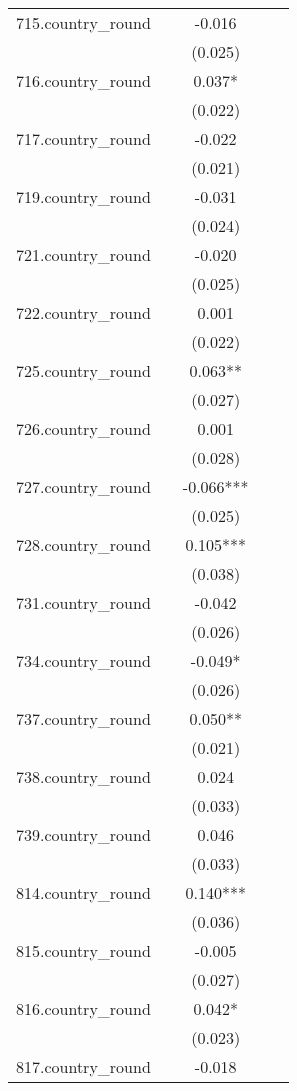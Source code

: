 \documentclass[]{article}
\begin{document}
\begin{tabular}{lcccc}
715.country\_round &  & -0.016 &  &  \\
 &  & (0.025) &  &  \\
716.country\_round &  & 0.037* &  &  \\
 &  & (0.022) &  &  \\
717.country\_round &  & -0.022 &  &  \\
 &  & (0.021) &  &  \\
719.country\_round &  & -0.031 &  &  \\
 &  & (0.024) &  &  \\
721.country\_round &  & -0.020 &  &  \\
 &  & (0.025) &  &  \\
722.country\_round &  & 0.001 &  &  \\
 &  & (0.022) &  &  \\
725.country\_round &  & 0.063** &  &  \\
 &  & (0.027) &  &  \\
726.country\_round &  & 0.001 &  &  \\
 &  & (0.028) &  &  \\
727.country\_round &  & -0.066*** &  &  \\
 &  & (0.025) &  &  \\
728.country\_round &  & 0.105*** &  &  \\
 &  & (0.038) &  &  \\
731.country\_round &  & -0.042 &  &  \\
 &  & (0.026) &  &  \\
734.country\_round &  & -0.049* &  &  \\
 &  & (0.026) &  &  \\
737.country\_round &  & 0.050** &  &  \\
 &  & (0.021) &  &  \\
738.country\_round &  & 0.024 &  &  \\
 &  & (0.033) &  &  \\
739.country\_round &  & 0.046 &  &  \\
 &  & (0.033) &  &  \\
814.country\_round &  & 0.140*** &  &  \\
 &  & (0.036) &  &  \\
815.country\_round &  & -0.005 &  &  \\
 &  & (0.027) &  &  \\
816.country\_round &  & 0.042* &  &  \\
 &  & (0.023) &  &  \\
817.country\_round &  & -0.018 &  &  \\

\end{tabular}
\end{document}
